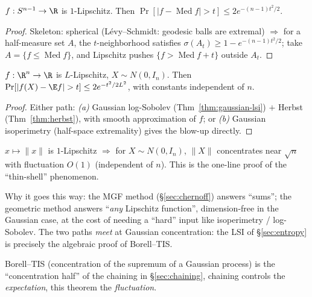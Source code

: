 
\begin{theorem}\label{thm:levy}
$f:S^{n-1}\to\R$ is $1$-Lipschitz. Then $\Pr[|f-\operatorname{Med}f|>t]\le 2e^{-(n-1)t^2/2}$.
\end{theorem}
\begin{proof}
Skeleton: spherical  (Lévy–Schmidt: geodesic balls are extremal) $\Rightarrow$ for a
half-measure set $A$, the $t$-neighborhood satisfies $\sigma(A_t)\ge 1-e^{-(n-1)t^2/2}$; take $A=\{f\le\operatorname{Med}f\}$,
and Lipschitz pushes $\{f>\operatorname{Med}f+t\}$ outside $A_t$. 
\end{proof}

\begin{theorem}\label{thm:gaussian-conc}
$f:\R^n\to\R$ is $L$-Lipschitz, $X\sim N(0,I_n)$. Then $\Pr[|f(X)-\E f|>t]\le 2e^{-t^2/2L^2}$, with constants independent of $n$.
\end{theorem}
\begin{proof}
Either path: \emph{(a)} Gaussian log-Sobolev (Thm~\ref{thm:gaussian-lsi}) $+$ Herbst (Thm~\ref{thm:herbst}), with smooth
approximation of $f$; or \emph{(b)} Gaussian isoperimetry (half-space extremality) gives the blow-up directly.
\end{proof}

\begin{example}\label{ex:norm-conc}
$x\mapsto\|x\|$ is $1$-Lipschitz $\Rightarrow$ for $X\sim N(0,I_n)$, $\|X\|$ concentrates near $\sqrt n$ with
fluctuation $O(1)$ (independent of $n$). This is the one-line proof of the ``thin-shell'' phenomenon.
\end{example}

\begin{strand}
Why it goes this way: the MGF method (§\ref{sec:chernoff}) answers ``sums''; the geometric method answers
``\emph{any} Lipschitz function'', dimension-free in the Gaussian case, at the cost of needing a ``hard'' input
like isoperimetry / log-Sobolev. The two paths \emph{meet} at Gaussian concentration: the LSI of §\ref{sec:entropy}
is precisely the algebraic proof of Borell–TIS.
\end{strand}

%
 Borell–TIS (concentration of the supremum of a Gaussian process) is the ``concentration half'' of the chaining in §\ref{sec:chaining}, chaining controls the \emph{expectation}, this theorem the \emph{fluctuation}. 
